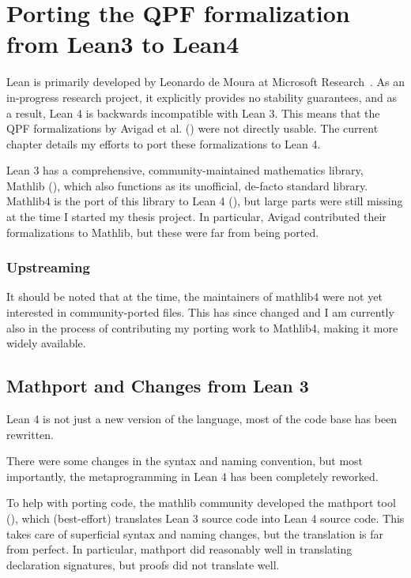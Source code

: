 
\chapter{Porting the QPF formalization from Lean3 to Lean4}%
\label{ch:porting}

Lean is primarily developed by Leonardo de Moura \etal{} at Microsoft Research~\cite{demouraLeanTheoremProver2015, avigadTheoremProvingLean}. As an in-progress research project, it explicitly provides no stability guarantees, and as a result, Lean 4 is backwards incompatible with Lean 3.
This means that the QPF formalizations by Avigad et al. \etal{}
(\cite{avigadDataTypesQuotients2019a}) were not directly usable. The current chapter details my efforts to port these formalizations to Lean 4.



Lean 3 has a comprehensive, community-maintained mathematics library, Mathlib (\cite{themathlibcommunityLeanMathematicalLibrary2020}), 
which also functions as its unofficial, de-facto standard library.
Mathlib4 is the port of this library to Lean 4 (\cite{mathlib4}),
but large parts were still missing at the time I started my thesis project.
In particular, Avigad \etal{} contributed their formalizations to Mathlib, but these were far from
being ported.



\subsection*{Upstreaming}
It should be noted that at the time, the maintainers of mathlib4 were not yet interested in 
community-ported files. This has since changed and I am currently also in the process of
contributing my porting work to Mathlib4, making it more widely available.




\section{Mathport and Changes from Lean 3}
Lean 4 is not just a new version of the language, most of the code base has been rewritten.

There were some changes in the syntax and naming convention, but most importantly, 
the metaprogramming in Lean 4 has been completely reworked.

To help with porting code, the mathlib community developed the mathport tool (\cite{mathport}), which 
(best-effort) translates Lean 3 source code into Lean 4 source code. This takes care of superficial 
syntax and naming changes, but the translation is far from perfect.
In particular, mathport did reasonably well in translating declaration signatures, 
but proofs did not translate well.

